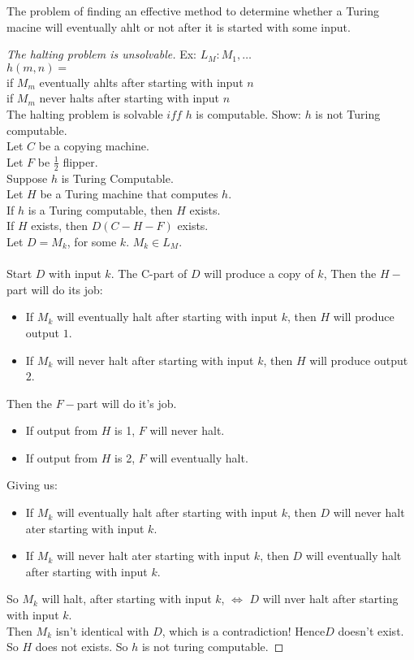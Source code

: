 \begin{definition}
The problem of finding an effective method to determine whether a Turing macine will eventually ahlt or not after it is started with some input.
\end{definition}
\begin{proof}[The halting problem is unsolvable]
Ex: $L_M: M_1,\dots$ \\
$h(m,n) =$ \\ %
 if $M_m$ eventually ahlts after starting with input $n$ \\
 if $M_m$ never halts after starting with input $n$ \\ 
The halting problem is solvable $iff$ $h$ is computable.
Show: $h$ is not Turing computable. \\
Let $C$ be a copying machine. \\
Let $F$ be $\frac{1}{2}$ flipper.\\
Suppose $h$ is Turing Computable.\\
Let $H$ be a Turing machine that computes $h$.\\
If $h$ is a Turing computable, then $H$ exists.\\
If $H$ exists, then $D(C-H-F)$ exists. \\
Let $D = M_k$, for some $k$. $M_k \in L_M$.\\
\\
Start $D$ with input $k$.
The C-part of $D$ will produce a copy of $k$,
Then the $H-$part will do its job:
\begin{itemize}
\item If $M_k$ will eventually halt after starting with input $k$, then $H$ will produce output $1$.
\item If $M_k$ will never halt after starting with input $k$, then $H$ will produce output $2$.
\end{itemize}
Then the $F-$part will do it's job.
\begin{itemize}
\item If output from $H$ is 1, $F$ will never halt.
\item If output from $H$ is 2, $F$ will eventually halt.
\end{itemize}
Giving us: \\
\begin{itemize}
\item If $M_k$ will eventually halt after starting with input $k$, then $D$ will never halt ater starting with input $k$. \\
\item If $M_k$ will never halt ater starting with input $k$, then $D$ will eventually halt after starting with input $k$. \\
\end{itemize}
So $M_k$ will halt, after starting with input $k$, $\iff$ $D$ will nver halt after starting with input $k$.\\
Then $M_k$ isn't identical with $D$, which is a contradiction! Hence$D$ doesn't exist. So $H$ does not exists. So $h$ is not turing computable.
\end{proof}


